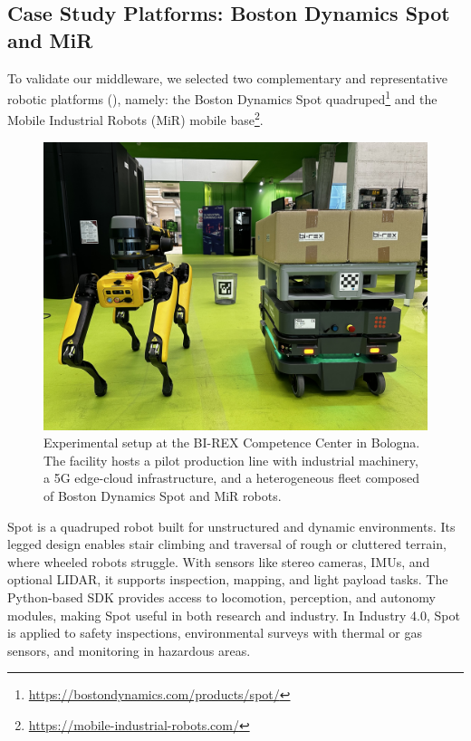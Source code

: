\documentclass[conference]{IEEEtran}
\begin{document}
\subsection{Case Study Platforms: Boston Dynamics Spot and MiR}

To validate our middleware, 
 we selected two complementary and representative robotic platforms (), namely: 
 the Boston Dynamics Spot quadruped\footnote{\url{https://bostondynamics.com/products/spot/}}
 and the Mobile Industrial Robots (MiR) mobile base\footnote{\url{https://mobile-industrial-robots.com/}}.

\begin{figure}[htb]
    \centering
    \includegraphics[width=1\columnwidth]{images/robots.jpeg}
    \caption{
        Experimental setup at the BI-REX Competence Center in Bologna. 
        The facility hosts a pilot production line with industrial machinery, 
        a 5G edge-cloud infrastructure, and a heterogeneous fleet composed of Boston Dynamics Spot and MiR robots.
    }
    \label{fig:robots}
\end{figure}

Spot is a quadruped robot built for unstructured and dynamic environments.
%
Its legged design enables stair climbing and traversal of rough or cluttered terrain, 
 where wheeled robots struggle.
%
With sensors like stereo cameras, IMUs, and optional LIDAR, 
 it supports inspection, mapping, and light payload tasks.
%
The Python-based SDK provides access to locomotion, perception, and autonomy modules, 
 making Spot useful in both research and industry.
%
In Industry 4.0, Spot is applied to safety inspections, environmental surveys with thermal or gas sensors, 
 and monitoring in hazardous areas.
\end{document}
